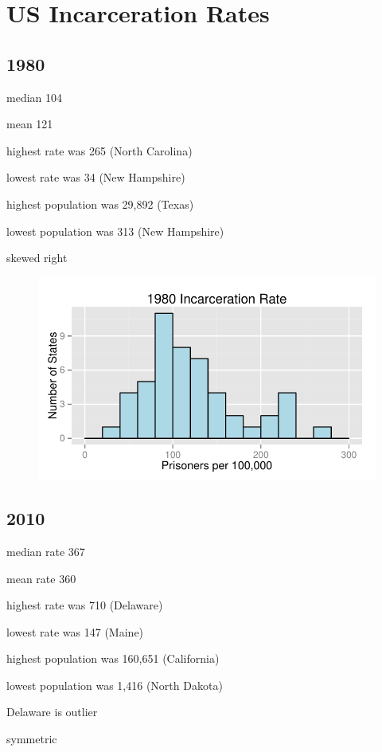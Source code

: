 \documentclass[letterpaper, landscape]{article}
\begin{document}
  \section{US Incarceration Rates}

  \subsection{1980}

  \begin{itemize*}
    \item median 104
    \item mean 121
    \item highest rate was 265 (North Carolina)
    \item lowest rate was 34 (New Hampshire)
    \item highest population was 29,892 (Texas)
    \item lowest population was 313 (New Hampshire)
    \item skewed right
  \end{itemize*}

  \begin{figure}[H]
    \centering
    \includegraphics[scale = 0.8]{figures/rate_histogram_1980.pdf}
  \end{figure}


  \subsection{2010}
  \begin{itemize*}
    \item median rate 367
    \item mean rate 360
    \item highest rate was 710 (Delaware)
    \item lowest rate was 147 (Maine)
    \item highest population was 160,651 (California)
    \item lowest population was 1,416 (North Dakota)
    \item Delaware is outlier
    \item symmetric
  \end{itemize*}
\end{document}
